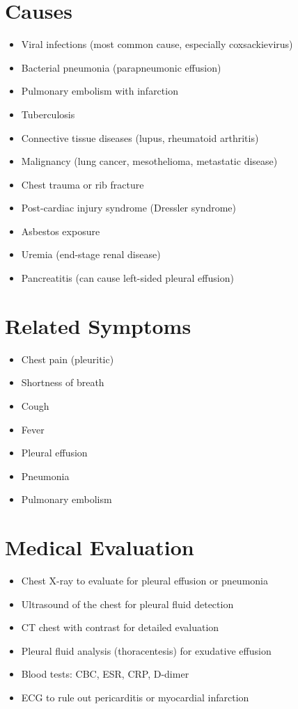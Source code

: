 \section*{Causes}
\begin{itemize}
\item Viral infections (most common cause, especially coxsackievirus)
\item Bacterial pneumonia (parapneumonic effusion)
\item Pulmonary embolism with infarction
\item Tuberculosis
\item Connective tissue diseases (lupus, rheumatoid arthritis)
\item Malignancy (lung cancer, mesothelioma, metastatic disease)
\item Chest trauma or rib fracture
\item Post-cardiac injury syndrome (Dressler syndrome)
\item Asbestos exposure
\item Uremia (end-stage renal disease)
\item Pancreatitis (can cause left-sided pleural effusion)
\end{itemize}

\section*{Related Symptoms}
\begin{itemize}
\item Chest pain (pleuritic)
\item Shortness of breath
\item Cough
\item Fever
\item Pleural effusion
\item Pneumonia
\item Pulmonary embolism
\end{itemize}

\section*{Medical Evaluation}
\begin{itemize}
\item Chest X-ray to evaluate for pleural effusion or pneumonia
\item Ultrasound of the chest for pleural fluid detection
\item CT chest with contrast for detailed evaluation
\item Pleural fluid analysis (thoracentesis) for exudative effusion
\item Blood tests: CBC, ESR, CRP, D-dimer
\item ECG to rule out pericarditis or myocardial infarction
\end{itemize}

